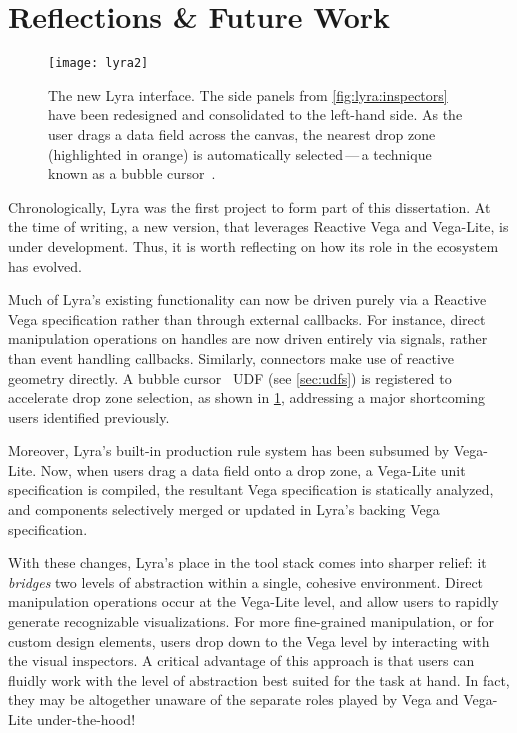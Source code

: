 \vspace{-10pt}

\section{Reflections \& Future Work}

\vspace{-10pt}

\begin{figure}[b!]
\texttt{[image: lyra2]}
\caption{The new Lyra interface. The side panels from \cref{fig:lyra:inspectors}
have been redesigned and consolidated to the left-hand side. As the user drags a
data field across the canvas, the nearest drop zone (highlighted in orange) is
automatically selected\,---\,a technique known as a bubble
cursor~\cite{grossman:bubble}.}
\label{fig:lyra2}
\end{figure}

Chronologically, Lyra was the first project to form part of this dissertation.
At the time of writing, a new version, that leverages Reactive Vega and
Vega-Lite, is under development. Thus, it is worth reflecting on how its role in
the ecosystem has evolved.

Much of Lyra's existing functionality can now be driven purely via a Reactive
Vega specification rather than through external callbacks. For instance, direct
manipulation operations on handles are now driven entirely via signals, rather
than event handling callbacks. Similarly, connectors make use of reactive
geometry directly. A bubble cursor~\cite{grossman:bubble} UDF (see
\cref{sec:udfs}) is registered to accelerate drop zone selection, as shown in
\cref{fig:lyra2}, addressing a major shortcoming users identified previously.

Moreover, Lyra's built-in production rule system has been subsumed by Vega-Lite.
Now, when users drag a data field onto a drop zone, a Vega-Lite unit
specification is compiled, the resultant Vega specification is statically
analyzed, and components selectively merged or updated in Lyra's backing Vega
specification.

With these changes, Lyra's place in the tool stack comes into sharper relief: it
\emph{bridges} two levels of abstraction within a single, cohesive environment.
Direct manipulation operations occur at the Vega-Lite level, and allow users to
rapidly generate recognizable visualizations. For more fine-grained
manipulation, or for custom design elements, users drop down to the Vega level
by interacting with the visual inspectors. A critical advantage of this approach
is that users can fluidly work with the level of abstraction best suited for the
task at hand. In fact, they may be altogether unaware of the separate roles
played by Vega and Vega-Lite under-the-hood!


